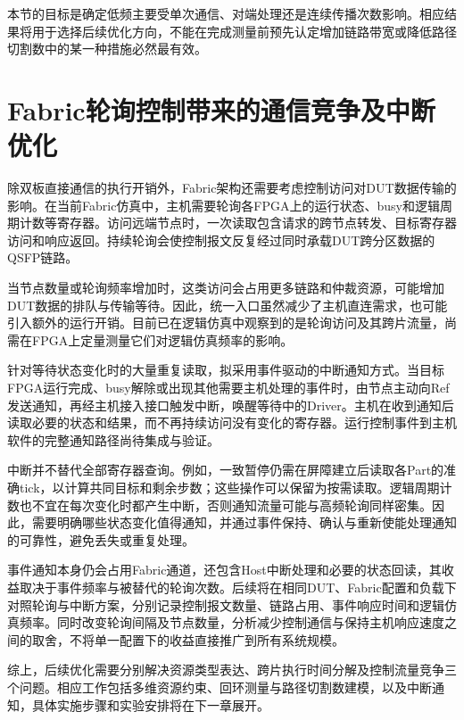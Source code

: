 本节的目标是确定低频主要受单次通信、对端处理还是连续传播次数影响。相应结果将用于选择后续优化方向，不能在完成测量前预先认定增加链路带宽或降低路径切割数中的某一种措施必然最有效。


\section{Fabric轮询控制带来的通信竞争及中断优化}
\label{sec:midterm-fabric-polling-problem}

除双板直接通信的执行开销外，Fabric架构还需要考虑控制访问对DUT数据传输的影响。在当前Fabric仿真中，主机需要轮询各FPGA上的运行状态、busy和逻辑周期计数等寄存器。访问远端节点时，一次读取包含请求的跨节点转发、目标寄存器访问和响应返回。持续轮询会使控制报文反复经过同时承载DUT跨分区数据的QSFP链路。

当节点数量或轮询频率增加时，这类访问会占用更多链路和仲裁资源，可能增加DUT数据的排队与传输等待。因此，统一入口虽然减少了主机直连需求，也可能引入额外的运行开销。目前已在逻辑仿真中观察到的是轮询访问及其跨片流量，尚需在FPGA上定量测量它们对逻辑仿真频率的影响。

针对等待状态变化时的大量重复读取，拟采用事件驱动的中断通知方式。当目标FPGA运行完成、busy解除或出现其他需要主机处理的事件时，由节点主动向Ref发送通知，再经主机接入接口触发中断，唤醒等待中的Driver。主机在收到通知后读取必要的状态和结果，而不再持续访问没有变化的寄存器。运行控制事件到主机软件的完整通知路径尚待集成与验证。

中断并不替代全部寄存器查询。例如，一致暂停仍需在屏障建立后读取各Part的准确tick，以计算共同目标和剩余步数；这些操作可以保留为按需读取。逻辑周期计数也不宜在每次变化时都产生中断，否则通知流量可能与高频轮询同样密集。因此，需要明确哪些状态变化值得通知，并通过事件保持、确认与重新使能处理通知的可靠性，避免丢失或重复处理。

事件通知本身仍会占用Fabric通道，还包含Host中断处理和必要的状态回读，其收益取决于事件频率与被替代的轮询次数。后续将在相同DUT、Fabric配置和负载下对照轮询与中断方案，分别记录控制报文数量、链路占用、事件响应时间和逻辑仿真频率。同时改变轮询间隔及节点数量，分析减少控制通信与保持主机响应速度之间的取舍，不将单一配置下的收益直接推广到所有系统规模。

综上，后续优化需要分别解决资源类型表达、跨片执行时间分解及控制流量竞争三个问题。相应工作包括多维资源约束、回环测量与路径切割数建模，以及中断通知，具体实施步骤和实验安排将在下一章展开。

